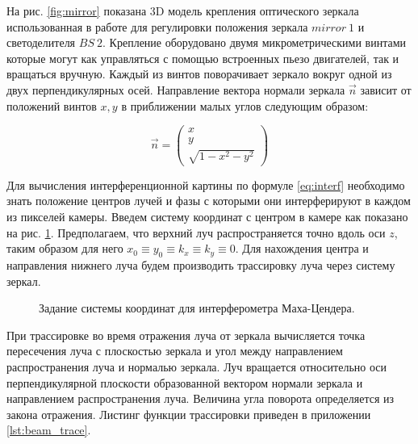 На рис. \ref{fig:mirror} показана 3D модель крепления оптического зеркала использованная в работе для регулировки положения зеркала $mirror\ 1$ и светоделителя $BS\ 2$. Крепление оборудовано двумя микрометрическими винтами которые могут как управляться с помощью встроенных пьезо двигателей, так и вращаться вручную. Каждый из винтов поворачивает зеркало вокруг одной из двух перпендикулярных осей. Направление вектора нормали зеркала $\vec{n}$ зависит от положений винтов $x, y$ в приближении малых углов следующим образом: 

\begin{equation}
    \vec{n} = \begin{pmatrix}
        x\\ 
        y\\ 
        \sqrt{1 - x^2 - y^2}
    \end{pmatrix}
\end{equation}


Для вычисления интерференционной картины по формуле \eqref{eq:interf} необходимо знать положение центров лучей и фазы с которыми они интерферируют в каждом из пикселей камеры. Введем систему координат с центром в камере как показано на рис. \ref{fig:MZI_coordis}. Предполагаем, что верхний луч распространяется точно вдоль оси  $z$, таким образом для него $x_0\equiv y_0\equiv k_x\equiv k_y\equiv 0$. Для нахождения центра и направления нижнего луча будем производить трассировку  луча через систему зеркал. 

\begin{figure}[ht]
\caption{Задание системы координат для интерферометра Маха-Цендера.}
\label{fig:MZI_coordis}
\end{figure}

При трассировке во время отражения луча от зеркала вычисляется точка пересечения луча с плоскостью зеркала и угол между направлением распространения луча и нормалью зеркала. Луч вращается относительно оси перпендикулярной плоскости образованной вектором нормали зеркала и  направлением распространения луча. Величина угла поворота определяется из закона отражения. Листинг функции трассировки приведен в приложении \ref{lst:beam_trace}.


